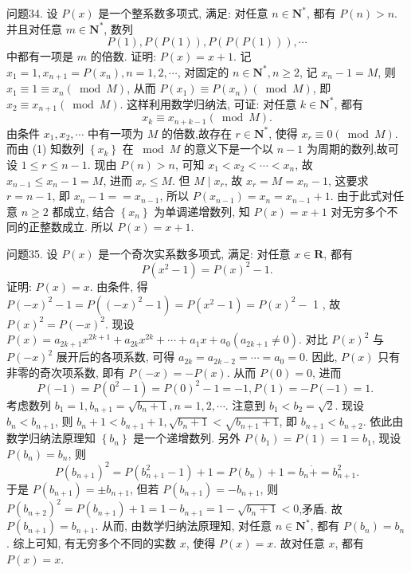 问题34. 设 $P(x)$ 是一个整系数多项式, 满足: 对任意 $n \in \mathbf{N}^*$, 都有 $P(n)>n$. 并且对任意 $m \in \mathbf{N}^*$, 数列
$$
P(1), P(P(1)), P(P(P(1))), \cdots
$$
中都有一项是 $m$ 的倍数.
证明: $P(x)=x+1$.
记 $x_1=1, x_{n+1}=P\left(x_n\right), n=1,2, \cdots$, 对固定的 $n \in \mathbf{N}^*, n \geqslant 2$, 记 $x_n-1=M$, 则 $x_1 \equiv 1 \equiv x_n(\bmod M)$, 从而 $P\left(x_1\right) \equiv P\left(x_n\right)(\bmod M)$, 即 $x_2 \equiv x_{n+1}(\bmod M)$. 这样利用数学归纳法, 可证: 对任意 $k \in \mathbf{N}^*$, 都有
$$
x_k \equiv x_{n+k-1}(\bmod M) . \label{(1)}
$$
由条件 $x_1, x_2, \cdots$ 中有一项为 $M$ 的倍数,故存在 $r \in \mathbf{N}^*$, 使得 $x_r \equiv 0 (\bmod M)$. 而由 (1) 知数列 $\left\{x_k\right\}$ 在 $\bmod M$ 的意义下是一个以 $n-1$ 为周期的数列,故可设 $1 \leqslant r \leqslant n-1$.
现由 $P(n)>n$, 可知 $x_1<x_2<\cdots<x_n$, 故 $x_{n-1} \leqslant x_n-1=M$, 进而 $x_r \leqslant M$. 但 $M \mid x_r$, 故 $x_r=M=x_n-1$, 这要求 $r=n-1$, 即 $x_n-1==x_{n-1}$, 所以 $P\left(x_{n-1}\right)=x_n=x_{n-1}+1$. 由于此式对任意 $n \geqslant 2$ 都成立, 结合 $\left\{x_n\right\}$ 为单调递增数列, 知 $P(x)=x+1$ 对无穷多个不同的正整数成立.
所以 $P(x)=x+1$.



问题35. 设 $P(x)$ 是一个奇次实系数多项式, 满足: 对任意 $x \in \mathbf{R}$, 都有
$$
P\left(x^2-1\right)=P(x)^2-1 .
$$
证明: $P(x)=x$.
由条件, 得 $P(-x)^2-1=P\left((-x)^2-1\right)=P\left(x^2-1\right)=P(x)^2-$ 1 , 故 $P(x)^2=P(-x)^2$. 现设 $P(x)=a_{2 k+1} x^{2 k+1}+a_{2 k} x^{2 k}+\cdots+a_1 x+ a_0\left(a_{2 k+1} \neq 0\right)$. 对比 $P(x)^2$ 与 $P(-x)^2$ 展开后的各项系数, 可得 $a_{2 k}= a_{2 k-2}=\cdots=a_0=0$. 因此, $P(x)$ 只有非零的奇次项系数, 即有 $P(-x)= -P(x)$. 从而 $P(0)=0$, 进而
$$
P(-1)=P\left(0^2-1\right)=P(0)^2-1=-1, P(1)=-P(-1)=1 \text {. }
$$
考虑数列 $b_1=1, b_{n+1}=\sqrt{b_n+1}, n=1,2, \cdots$. 注意到 $b_1<b_2=\sqrt{2}$. 现设 $b_n<b_{n+1}$, 则 $b_n+1<b_{n+1}+1, \sqrt{b_n+1}<\sqrt{b_{n+1}+1}$, 即 $b_{n+1}<b_{n+2}$. 依此由数学归纳法原理知 $\left\{b_n\right\}$ 是一个递增数列.
另外 $P\left(b_1\right)=P(1)=1=b_1$, 现设 $P\left(b_n\right)=b_n$, 则
$$
P\left(b_{n+1}\right)^2=P\left(b_{n+1}^2-1\right)+1=P\left(b_n\right)+1=b_n \dot{+}=b_{n+1}^2 .
$$
于是 $P\left(b_{n+1}\right)= \pm b_{n+1}$, 但若 $P\left(b_{n+1}\right)=-b_{n+1}$, 则 $P\left(b_{n+2}\right)^2=P\left(b_{n+1}\right)+1= 1-b_{n+1}=1-\sqrt{b_n+1}<0$,矛盾.
故 $P\left(b_{n+1}\right)=b_{n+1}$. 从而, 由数学归纳法原理知, 对任意 $n \in \mathbf{N}^*$, 都有 $P\left(b_n\right)=b_n$.
综上可知, 有无穷多个不同的实数 $x$, 使得 $P(x)=x$. 故对任意 $x$, 都有 $P(x)=x$.



